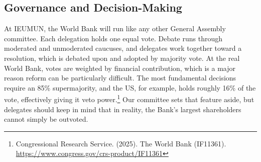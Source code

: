 \subsection{Governance and Decision-Making}

At IEUMUN, the World Bank will run like any other General Assembly committee. Each delegation holds one equal vote. Debate runs through moderated and unmoderated caucuses, and delegates work together toward a resolution, which is debated upon and adopted by majority vote. At the real World Bank, votes are weighted by financial contribution, which is a major reason reform can be particularly difficult. The most fundamental decisions require an 85\% supermajority, and the US, for example, holds roughly 16\% of the vote, effectively giving it veto power.\footnote{Congressional Research Service. (2025). The World Bank (IF11361). \url{https://www.congress.gov/crs-product/IF11361}} Our committee sets that feature aside, but delegates should keep in mind that in reality, the Bank’s largest shareholders cannot simply be outvoted.
